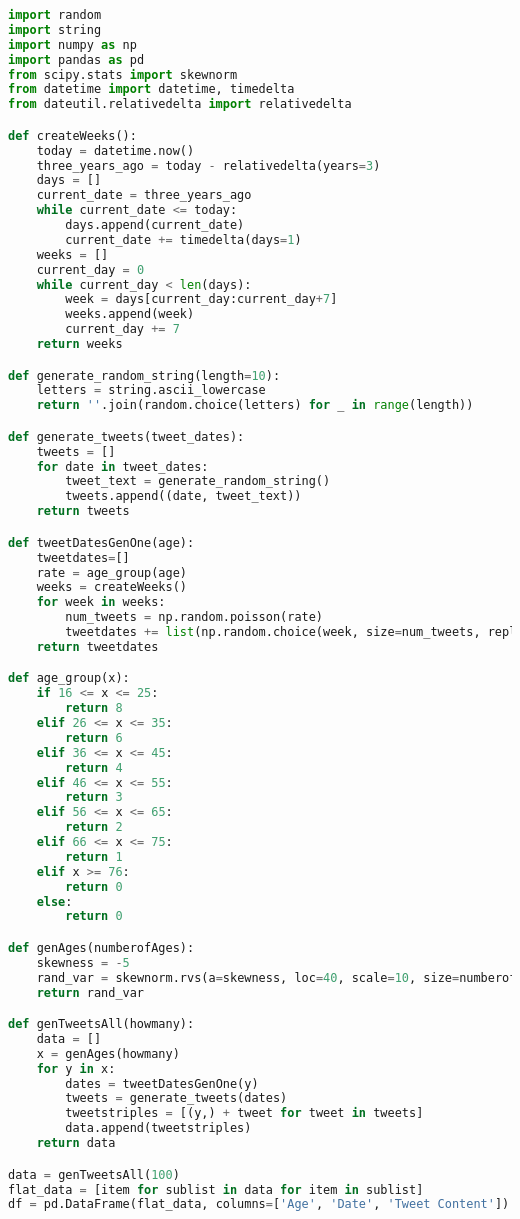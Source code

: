 \documentclass{article}
\begin{document}
\begin{lstlisting}[language=Python]
import random
import string
import numpy as np
import pandas as pd
from scipy.stats import skewnorm
from datetime import datetime, timedelta
from dateutil.relativedelta import relativedelta

def createWeeks():
    today = datetime.now()
    three_years_ago = today - relativedelta(years=3)
    days = []
    current_date = three_years_ago
    while current_date <= today:
        days.append(current_date)
        current_date += timedelta(days=1)
    weeks = []
    current_day = 0
    while current_day < len(days):
        week = days[current_day:current_day+7]
        weeks.append(week)
        current_day += 7
    return weeks

def generate_random_string(length=10):
    letters = string.ascii_lowercase
    return ''.join(random.choice(letters) for _ in range(length))

def generate_tweets(tweet_dates):
    tweets = []
    for date in tweet_dates:
        tweet_text = generate_random_string()
        tweets.append((date, tweet_text))
    return tweets

def tweetDatesGenOne(age):
    tweetdates=[]
    rate = age_group(age)
    weeks = createWeeks()
    for week in weeks:
        num_tweets = np.random.poisson(rate)
        tweetdates += list(np.random.choice(week, size=num_tweets, replace=True))
    return tweetdates

def age_group(x):
    if 16 <= x <= 25:
        return 8
    elif 26 <= x <= 35:
        return 6
    elif 36 <= x <= 45:
        return 4
    elif 46 <= x <= 55:
        return 3
    elif 56 <= x <= 65:
        return 2
    elif 66 <= x <= 75:
        return 1
    elif x >= 76:
        return 0
    else:
        return 0

def genAges(numberofAges):
    skewness = -5
    rand_var = skewnorm.rvs(a=skewness, loc=40, scale=10, size=numberofAges)
    return rand_var

def genTweetsAll(howmany):
    data = []
    x = genAges(howmany)
    for y in x:
        dates = tweetDatesGenOne(y)
        tweets = generate_tweets(dates)
        tweetstriples = [(y,) + tweet for tweet in tweets]
        data.append(tweetstriples)
    return data

data = genTweetsAll(100)
flat_data = [item for sublist in data for item in sublist]
df = pd.DataFrame(flat_data, columns=['Age', 'Date', 'Tweet Content'])
\end{lstlisting}
\end{document}
